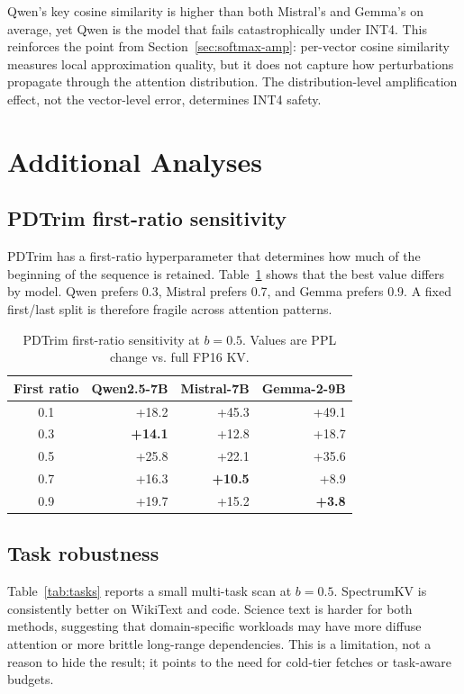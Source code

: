 \documentclass[11pt]{article}
\newcommand{\method}{SpectrumKV}
\newcommand{\budget}{b}
\theoremstyle{plain}
\theoremstyle{definition}
\begin{document}
Qwen's key cosine similarity is higher than both Mistral's and Gemma's on average, yet Qwen is the model that fails catastrophically under INT4.  This reinforces the point from Section~\ref{sec:softmax-amp}: per-vector cosine similarity measures local approximation quality, but it does not capture how perturbations propagate through the attention distribution.  The distribution-level amplification effect, not the vector-level error, determines INT4 safety.

\section{Additional Analyses}
\label{sec:additional}

\subsection{PDTrim first-ratio sensitivity}
PDTrim has a first-ratio hyperparameter that determines how much of the beginning of the sequence is retained.  Table~\ref{tab:fr} shows that the best value differs by model.  Qwen prefers 0.3, Mistral prefers 0.7, and Gemma prefers 0.9.  A fixed first/last split is therefore fragile across attention patterns.

\begin{table}[h]
\centering
\caption{PDTrim first-ratio sensitivity at $\budget=0.5$.  Values are PPL change vs. full FP16 KV.}
\label{tab:fr}
\small
\begin{tabular}{crrr}
\toprule
First ratio & Qwen2.5-7B & Mistral-7B & Gemma-2-9B \\
\midrule
0.1 & +18.2 & +45.3 & +49.1 \\
0.3 & \textbf{+14.1} & +12.8 & +18.7 \\
0.5 & +25.8 & +22.1 & +35.6 \\
0.7 & +16.3 & \textbf{+10.5} & +8.9 \\
0.9 & +19.7 & +15.2 & \textbf{+3.8} \\
\bottomrule
\end{tabular}
\end{table}

\subsection{Task robustness}
Table~\ref{tab:tasks} reports a small multi-task scan at $\budget=0.5$.  \method{} is consistently better on WikiText and code.  Science text is harder for both methods, suggesting that domain-specific workloads may have more diffuse attention or more brittle long-range dependencies.  This is a limitation, not a reason to hide the result; it points to the need for cold-tier fetches or task-aware budgets.
\end{document}
